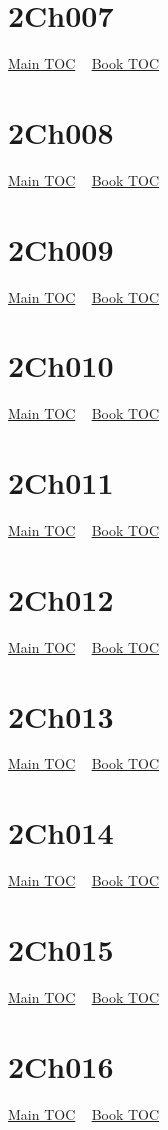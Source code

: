 \documentclass{book}
\begin{document}
  \section{2Ch007}\hyperlink{toc}{Main TOC} ~ \hyperref[subsec:2Ch]{Book TOC} 
  \section{2Ch008}\hyperlink{toc}{Main TOC} ~ \hyperref[subsec:2Ch]{Book TOC} 
  \section{2Ch009}\hyperlink{toc}{Main TOC} ~ \hyperref[subsec:2Ch]{Book TOC} 
  \section{2Ch010}\hyperlink{toc}{Main TOC} ~ \hyperref[subsec:2Ch]{Book TOC} 
  \section{2Ch011}\hyperlink{toc}{Main TOC} ~ \hyperref[subsec:2Ch]{Book TOC} 
  \section{2Ch012}\hyperlink{toc}{Main TOC} ~ \hyperref[subsec:2Ch]{Book TOC} 
  \section{2Ch013}\hyperlink{toc}{Main TOC} ~ \hyperref[subsec:2Ch]{Book TOC} 
  \section{2Ch014}\hyperlink{toc}{Main TOC} ~ \hyperref[subsec:2Ch]{Book TOC} 
  \section{2Ch015}\hyperlink{toc}{Main TOC} ~ \hyperref[subsec:2Ch]{Book TOC} 
  \section{2Ch016}\hyperlink{toc}{Main TOC} ~ \hyperref[subsec:2Ch]{Book TOC} 
\end{document}
